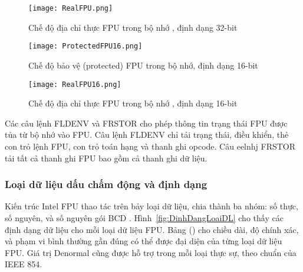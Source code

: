 \newpage
		\begin{center}
			\begin{figure}[htp]
				\begin{center}
					\texttt{[image: RealFPU.png]}
				\end{center}
				\caption{Chế độ địa chỉ thực FPU trong bộ nhớ , định dạng 32-bit  \protect\footnotemark}				
				\label{fig:RealFPU32}				
			\end{figure}
		\end{center}	
		
		\begin{center}
			\begin{figure}[htp]
				\begin{center}
					\texttt{[image: ProtectedFPU16.png]}
				\end{center}
				\caption{Chế độ bảo vệ (protected) FPU trong bộ nhớ, định dạng 16-bit  \protect\footnotemark}				
				\label{fig:ProtectedFPU16}				
			\end{figure}
		\end{center}	

		\begin{center}
			\begin{figure}[htp]
				\begin{center}
					\texttt{[image: RealFPU16.png]}
				\end{center}
				\caption{Chế độ địa chỉ thực FPU trong bộ nhớ , định dạng 16-bit  \protect\footnotemark}				
				\label{fig:ProtectedFPU16}				
			\end{figure}
		\end{center}	
		
	Các câu lệnh FLDENV và FRSTOR cho phép thông tin trạng thái FPU được tủa từ bộ nhớ vào FPU. Câu lệnh FLDENV chỉ tải trạng thái, điều khiển, thẻ con trỏ lệnh FPU, con trỏ toán hạng và thanh ghi opcode. Câu eelnhj FRSTOR tải tất cả thanh ghi FPU bao gồm cả thanh ghi dữ liệu.		
	
		\newpage	
		\subsubsection{Loại dữ liệu dấu chấm động và định dạng}
		Kiến trúc Intel FPU thao tác trên bảy loại dữ liệu, chia thành ba nhóm: số thực, số nguyên, và số nguyên gói BCD . Hình~\ref{fig:DinhDangLoaiDL} cho thấy các định dạng dữ liệu cho mỗi loại dữ liệu FPU. Bảng () cho chiều dài, độ chính xác, và phạm vi bình thường gần đúng có thể được đại diện của từng loại dữ liệu FPU. Giá trị Denormal cũng được hỗ trợ trong mỗi loại thực sự, theo chuẩn của IEEE 854.\\
		
